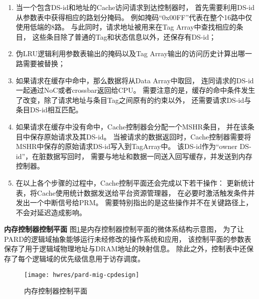 \begin{enumerate}[leftmargin=2\parindent, nolistsep, label=（\arabic*）]
  \item 当一个包含DS-id和地址的Cache访问请求到达控制器时，
        首先需要利用DS-id从参数表中获得相应的路划分掩码。
        例如掩码``0x00FF''代表在整个16路中仅使用低端的8路。
        与此同时，请求地址被用来在Tag Array中查找相应的条目，
        这些条目除了普通的Tag和状态信息以外，还保存有DS-id；
  \item 伪LRU逻辑利用参数表输出的掩码以及Tag Array输出的访问历史计算出哪一路需要被替换；
  \item 如果请求在缓存中命中，那么数据将从Data Array中取回，
        连同请求的DS-id一起通过NoC或者crossbar返回给CPU。
        需要注意的是，缓存的命中条件发生了改变，除了请求地址与条目Tag之间原有的约束以外，
        还需要请求DS-id与条目DS-id相互匹配。
  \item 如果请求在缓存中没有命中，Cache控制器会分配一个MSHR条目，
        并在该条目中保存原始请求及其DS-id。
        当被请求的数据返回时，Cache控制器需要将MSHR中保存的原始请求DS-id写入到TagArray中。
        该DS-id作为``owner DS-id''，在脏数据写回时，
        需要与地址和数据一同送入回写缓存，并发送到内存控制器。
  \item 在以上各个步骤的过程中，Cache控制平面还会完成以下若干操作：
        更新统计表，将Cache使用统计数据发送给平台资源管理器，
        在必要时激活触发条件并发出一个中断信号给PRM。
        需要特别指出的是这些操作并不在关键路径上，不会对延迟造成影响。
\end{enumerate}


\textbf{内存控制器控制平面}\quad
图\ref{fig:pard-mig-cpdesign}是内存控制器控制平面的微体系结构示意图，
为了让PARD的逻辑域抽象能够运行未经修改的操作系统和应用，
该控制平面的参数表保存了用于逻辑域物理地址与DRAM地址的映射信息。
除此之外，控制表中还保存了每个逻辑域的优先级信息用于访存调度。

\begin{figure}[tb]
  \centering
  \texttt{[image: hwres/pard-mig-cpdesign]}
  \caption{内存控制器控制平面}
  \label{fig:pard-mig-cpdesign}
\end{figure}


